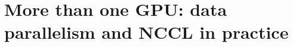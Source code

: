 \chapter{More than one GPU: data parallelism and NCCL in practice}
\label{ch:more-than-one-gpu-data-parallelism-and}

